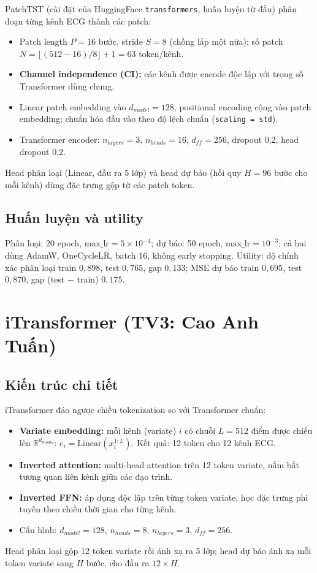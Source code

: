 \documentclass[12pt,a4paper]{report}
\begin{document}
PatchTST \cite{nie2023} (cài đặt của HuggingFace \texttt{transformers}, huấn luyện từ đầu) phân đoạn từng kênh ECG thành các patch:
\begin{itemize}
  \item Patch length $P = 16$ bước, stride $S = 8$ (chồng lấp một nửa); số patch $N = \lfloor (512 - 16)/8 \rfloor + 1 = 63$ token/kênh.
  \item \textbf{Channel independence (CI):} các kênh được encode độc lập với trọng số Transformer dùng chung.
  \item Linear patch embedding vào $d_{model} = 128$, positional encoding cộng vào patch embedding; chuẩn hóa đầu vào theo độ lệch chuẩn (\texttt{scaling = std}).
  \item Transformer encoder: $n_{layers} = 3$, $n_{heads} = 16$, $d_{ff} = 256$, dropout 0,2, head dropout 0,2.
\end{itemize}
Head phân loại (Linear, đầu ra 5 lớp) và head dự báo (hồi quy $H = 96$ bước cho mỗi kênh) dùng đặc trưng gộp từ các patch token.

\subsection{Huấn luyện và utility}

Phân loại: 20 epoch, $\text{max\_lr} = 5 \times 10^{-4}$; dự báo: 50 epoch, $\text{max\_lr} = 10^{-3}$; cả hai dùng AdamW, OneCycleLR, batch 16, không early stopping. Utility: độ chính xác phân loại train $0{,}898$, test $0{,}765$, gap $0{,}133$; MSE dự báo train $0{,}695$, test $0{,}870$, gap (test $-$ train) $0{,}175$.

\section{iTransformer (TV3: Cao Anh Tuấn)}

\subsection{Kiến trúc chi tiết}

iTransformer \cite{liu2024} đảo ngược chiều tokenization so với Transformer chuẩn:
\begin{itemize}
  \item \textbf{Variate embedding:} mỗi kênh (variate) $i$ có chuỗi $L = 512$ điểm được chiếu lên $\mathbb{R}^{d_{model}}$: $e_i = \text{Linear}(x_i^{1:L})$. Kết quả: 12 token cho 12 kênh ECG.
  \item \textbf{Inverted attention:} multi-head attention trên 12 token variate, nắm bắt tương quan liên kênh giữa các đạo trình.
  \item \textbf{Inverted FFN:} áp dụng độc lập trên từng token variate, học đặc trưng phi tuyến theo chiều thời gian cho từng kênh.
  \item Cấu hình: $d_{model} = 128$, $n_{heads} = 8$, $n_{layers} = 3$, $d_{ff} = 256$.
\end{itemize}
Head phân loại gộp 12 token variate rồi ánh xạ ra 5 lớp; head dự báo ánh xạ mỗi token variate sang $H$ bước, cho đầu ra $12 \times H$.
\end{document}
